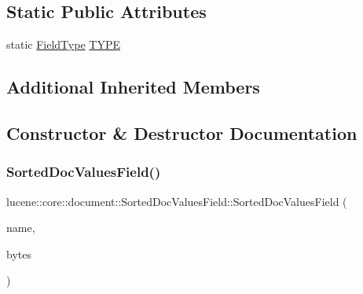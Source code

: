 \subsection*{Static Public Attributes}
\begin{DoxyCompactItemize}
\item 
static \mbox{\hyperlink{classlucene_1_1core_1_1document_1_1FieldType}{Field\+Type}} \mbox{\hyperlink{classlucene_1_1core_1_1document_1_1SortedDocValuesField_ae6962eedda0d777922501ab86f1728f1}{T\+Y\+PE}}
\end{DoxyCompactItemize}
\subsection*{Additional Inherited Members}


\subsection{Constructor \& Destructor Documentation}
\mbox{\label{classlucene_1_1core_1_1document_1_1SortedDocValuesField_ac719c5097e0d9280a600727b6832ed97}} 
\subsubsection{\texorpdfstring{Sorted\+Doc\+Values\+Field()}{SortedDocValuesField()}\hspace{0.1cm}{\footnotesize\ttfamily [1/2]}}
{\footnotesize\ttfamily lucene\+::core\+::document\+::\+Sorted\+Doc\+Values\+Field\+::\+Sorted\+Doc\+Values\+Field (\begin{DoxyParamCaption}\item[{\mbox{\hyperlink{ZlibCrc32_8h_a2c212835823e3c54a8ab6d95c652660e}{const}} std\+::string \&}]{name,  }\item[{\mbox{\hyperlink{ZlibCrc32_8h_a2c212835823e3c54a8ab6d95c652660e}{const}} \mbox{\hyperlink{classlucene_1_1core_1_1util_1_1BytesRef}{lucene\+::core\+::util\+::\+Bytes\+Ref}} \&}]{bytes }\end{DoxyParamCaption})\hspace{0.3cm}{\ttfamily [inline]}}

